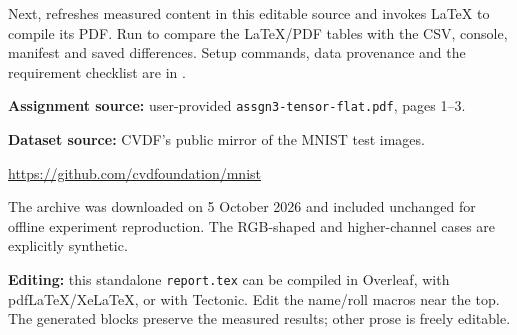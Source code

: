 \documentclass[11pt,a4paper]{article}
\begin{document}
Next,  refreshes measured content in this editable source
and invokes LaTeX to compile its PDF. Run  to compare
the LaTeX/PDF tables with the CSV, console, manifest and saved differences.
Setup commands, data provenance and the requirement checklist are in
.

\textbf{Assignment source:} user-provided \texttt{assgn3-tensor-flat.pdf}, pages 1--3.

\textbf{Dataset source:} CVDF's public mirror of the MNIST test images.
\par\url{https://github.com/cvdfoundation/mnist}
\par The archive was downloaded on 5 October 2026 and included unchanged
for offline experiment reproduction.
The RGB-shaped and higher-channel cases are explicitly synthetic.

\textbf{Editing:} this standalone \texttt{report.tex} can be compiled in Overleaf,
with pdfLaTeX/XeLaTeX, or with Tectonic. Edit the name/roll macros near the top.
The generated blocks preserve the measured results; other prose is freely editable.
\end{document}
